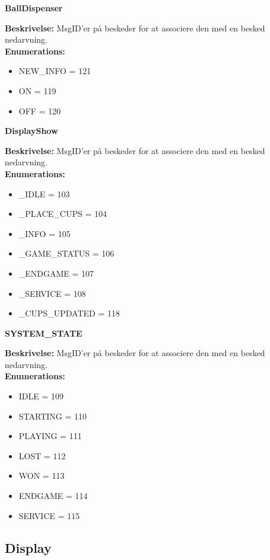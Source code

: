 \documentclass[Softwaredesign/Softwaredesign_main.tex]{subfiles}
\begin{document}
\textbf{BallDispenser}
\begin{adjustwidth}{1cm}{0pt}
\textbf{Beskrivelse:} MsgID'er på beskeder for at associere den med en besked nedarvning. \\[0.2cm]
\textbf{Enumerations:}
\begin{itemize}
    \item NEW\_INFO = 121
    \item ON = 119
    \item OFF = 120
\end{itemize}
\end{adjustwidth}

\textbf{DisplayShow}
\begin{adjustwidth}{1cm}{0pt}
\textbf{Beskrivelse:} MsgID'er på beskeder for at associere den med en besked nedarvning. \\[0.2cm]
\textbf{Enumerations:}
\begin{itemize}
    \item \_IDLE = 103
    \item \_PLACE\_CUPS = 104
    \item \_INFO = 105
    \item \_GAME\_STATUS = 106
	\item \_ENDGAME = 107
	\item \_SERVICE = 108
	\item \_CUPS\_UPDATED = 118
\end{itemize}
\end{adjustwidth}

\textbf{SYSTEM\_STATE}
\begin{adjustwidth}{1cm}{0pt}
\textbf{Beskrivelse:} MsgID'er på beskeder for at associere den med en besked nedarvning. \\[0.2cm]
\textbf{Enumerations:}
\begin{itemize}
    \item IDLE = 109
	\item STARTING = 110
	\item PLAYING = 111
	\item LOST = 112
	\item WON = 113
	\item ENDGAME = 114
	\item SERVICE = 115
\end{itemize}
\end{adjustwidth}


\subsection{Display}
\end{document}
